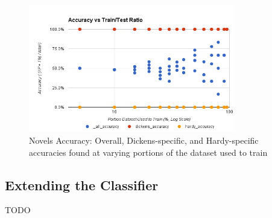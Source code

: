 \begin{figure}[ht!]
    \centering
    \includegraphics[width=90mm]{img/novels_basic-accuracy.png}
    \caption{Novels Accuracy: Overall, Dickens-specific, and Hardy-specific accuracies found at varying portions of the dataset used to train}
    \label{fig:smsBasicAccuracy}
\end{figure}


\subsection{Extending the Classifier}
\label{subsection:advancedResults}
TODO
